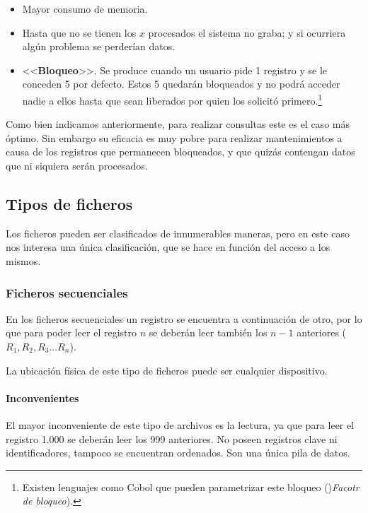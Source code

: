 \documentclass[a4paper, 11pt, titlepage]{article}
\begin{document}
            \begin{itemize}
                \item Mayor consumo de memoria.
                \item Hasta que no se tienen los $x$ procesados el sistema no graba; y si ocurriera algún 
                problema se perderían datos. 
                \item <<\textbf{Bloqueo}>>. Se produce cuando un usuario pide 1 registro y se le conceden 5 
                por defecto. Estos 5 quedarán bloqueados y no podrá acceder nadie a ellos hasta que sean liberados
                por quien los solicitó primero.\footnote{
                    Existen lenguajes como Cobol que pueden parametrizar este bloqueo ()\textit{Facotr de bloqueo}).
                }
            \end{itemize}

            Como bien indicamos anteriormente, para realizar consultas este es el caso más óptimo. Sin embargo
            su eficacia es muy pobre para realizar mantenimientos a causa de los registros que permanecen 
            bloqueados, y que quizás contengan datos que ni siquiera serán procesados.

    \subsection{Tipos de ficheros}

        Los ficheros pueden ser clasificados de innumerables maneras, pero en este caso nos interesa 
        una única clasificación, que se hace en función del acceso a los mismos.

        \subsubsection{Ficheros secuenciales}

            En los ficheros secuenciales un registro se encuentra a continuación de otro, por lo que 
            para poder leer el registro $n$ se deberán leer también los $n-1$ anteriores ($R_1, R_2,R_3...R_n$).

            La ubicación física de este tipo de ficheros puede ser cualquier dispositivo.

            \paragraph{Inconvenientes} El mayor inconveniente de este tipo de archivos es la lectura, ya que 
            para leer el registro 1.000 se deberán leer los 999 anteriores. No poseen registros clave ni 
            identificadores, tampoco se encuentran ordenados. Son una única pila de datos.
\end{document}
